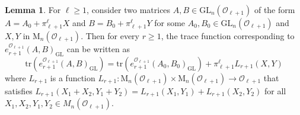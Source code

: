\documentclass[10pt,twoside]{amsart}
\newcommand{\GL}{\mathrm{GL}}
\newcommand{\tr}{\mathrm{tr}}
\newcommand{\M}{\mathrm{M}}
\theoremstyle{definition}
\theoremstyle{definition}
\newtheorem{lemma}[theorem]{Lemma}
\begin{document}
\begin{lemma}{\label{sum1}}
For $\ell\geq 1$, consider two matrices $A, B \in \GL_n(\mathcal{O}_{\ell+1})$ of the form $A = A_0 + \pi_{\ell+1}^{\ell} X$ and $B = B_0 + \pi_{\ell+1}^{\ell} Y$ for some $A_0, B_0\in \GL_n(\mathcal{O}_{\ell+1})$ and $X, Y$ in $\M_n(\mathcal{O}_{\ell+1})$. Then for every $r\geq 1$, the trace function corresponding to $e_{r+1}^{\mathcal{O}_{\ell+1}}(A,B)_{\GL}$ can be written as $$\tr(e_{r+1}^{\mathcal{O}_{\ell+1}}(A, B)_{\GL}) = \tr(e_{r+1}^{\mathcal{O}_{\ell+1}}(A_0, B_0)_{\GL}) + \pi_{\ell+1}^{\ell} L_{r+1}(X,Y)$$
where $L_{r+1}$ is a function $L_{r+1}\colon \M_n(\mathcal{O}_{\ell+1}) \times \M_n(\mathcal{O}_{\ell+1}) \rightarrow \mathcal{O}_{\ell+1}$ that satisfies $L_{r+1}(X_1+ X_2, Y_1 + Y_2) = L_{r+1}(X_1, Y_1) + L_{r+1}(X_2, Y_2)$ for all $X_1, X_2, Y_1, Y_2 \in M_n(\mathcal{O}_{\ell+1})$. 
\end{lemma}
\end{document}
